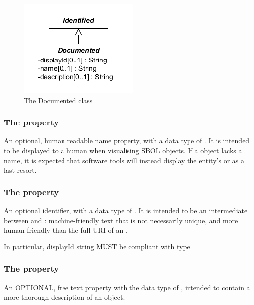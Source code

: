 \begin{figure}[ht]
\begin{center}
\includegraphics[scale=0.6]{uml/documented}
\caption[]{The Documented class}
\label{uml:documented}
\end{center}
\end{figure}

\subsubsection*{The  property}
\label{sec:name}
An optional, human readable name property, with a data type of . It is intended to be displayed to a human when visualising SBOL objects.  
If a  object lacks a name, it is expected that software tools will instead display the entity's  or  as a last resort.

\subsubsection*{The  property}
\label{sec:displayId}
An optional identifier, with a data type of . It is intended to be an intermediate between  and : machine-friendly text that is not necessarily unique, and more human-friendly than the full URI of an .

In particular, displayId string MUST be compliant with type 


\subsubsection*{The  property}
\label{sec:description}
An OPTIONAL, free text property with the data type of , intended to contain a more thorough description of an object.


